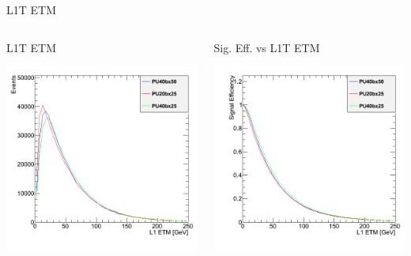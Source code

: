 \documentclass[8pt]{beamer}
\begin{document}
\begin{frame}{L1T ETM}

\begin{columns}

\begin{block}{L1T ETM}
 
\centering
\includegraphics[width=\linewidth]{img/hL1ETM.png}
 
\end{block}

\begin{block}{Sig. Eff. vs L1T ETM}
 
\centering
\includegraphics[width=\linewidth]{img/hEffL1ETM.png}
 

\end{block}
\end{columns}
\end{frame}
\end{document}
